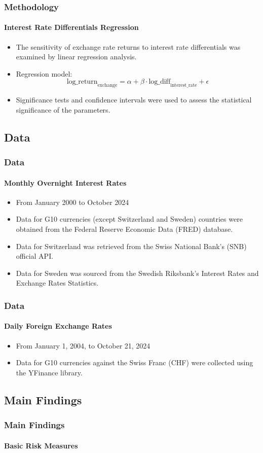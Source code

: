 \documentclass[10pt]{beamer}
\begin{document}
\begin{frame}
\frametitle{Methodology}
\framesubtitle{Interest Rate Differentials Regression}
\begin{itemize}
    \item The sensitivity of exchange rate returns to interest rate differentials was examined by linear regression analysis. 
    \item Regression model: \[
    \text{log\_return}_{\text{exchange}} = \alpha + \beta \cdot \text{log\_diff}_{\text{interest\_rate}} + \epsilon
    \]
    \item Significance tests and confidence intervals were used to assess the statistical significance of the parameters.
\end{itemize}
\end{frame}
\begin{frame}
\section{Data}
\frametitle{Data}
\framesubtitle{Monthly Overnight Interest Rates}
\begin{itemize}
    \item From January 2000 to October 2024
    \item Data for G10 currencies (except Switzerland and Sweden) countries were obtained from the Federal Reserve Economic Data (FRED) database.
    \item Data for Switzerland was retrieved from the Swiss National Bank's (SNB) official API.
    \item Data for Sweden was sourced from the Swedish Riksbank’s Interest Rates and Exchange Rates Statistics.
\end{itemize}
\end{frame}
\begin{frame}
\frametitle{Data}
\framesubtitle{Daily Foreign Exchange Rates}
\begin{itemize}
    \item From January 1, 2004, to October 21, 2024
    \item Data for G10 currencies against the Swiss Franc (CHF) were collected using the YFinance library. 
\end{itemize}
\end{frame}
\begin{frame}
\section{Main Findings}
\frametitle{Main Findings}
\framesubtitle{Basic Risk Measures}

\end{frame}
\end{document}

